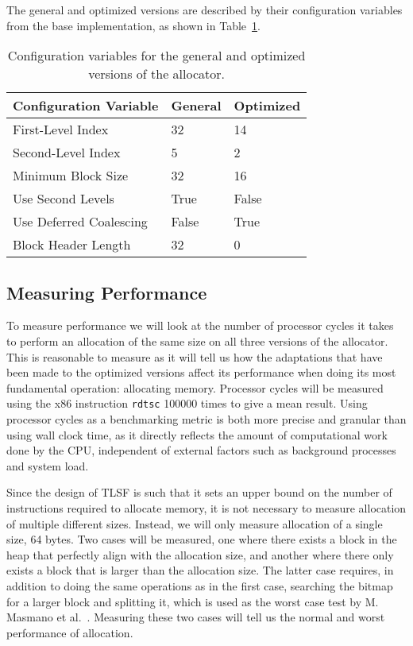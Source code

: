 The general and optimized versions are described by their configuration variables from the base implementation, as shown in Table~\ref{table:configuration-variables}.

\begin{table}[H]
\centering
\begin{tabular}{lllll}
\hline
Configuration Variable  & General  & \multicolumn{3}{l}{Optimized} \\ \hline
First-Level Index       & 32       & \multicolumn{3}{l}{14}        \\
Second-Level Index      & 5        & \multicolumn{3}{l}{2}         \\
Minimum Block Size      & 32       & \multicolumn{3}{l}{16 }       \\
Use Second Levels       & True     & \multicolumn{3}{l}{False}     \\
Use Deferred Coalescing & False    & \multicolumn{3}{l}{True}      \\
Block Header Length     & 32       & \multicolumn{3}{l}{0}        
\end{tabular}
\caption{Configuration variables for the general and optimized versions of the allocator.}
\label{table:configuration-variables}
\end{table}

\subsection{Measuring Performance}

To measure performance we will look at the number of processor cycles it takes to perform an allocation of the same size on all three versions of the allocator. This is reasonable to measure as it will tell us how the adaptations that have been made to the optimized versions affect its performance when doing its most fundamental operation: allocating memory. Processor cycles will be measured using the x86 instruction \texttt{rdtsc} 100000 times to give a mean result. Using processor cycles as a benchmarking metric is both more precise and granular than using wall clock time, as it directly reflects the amount of computational work done by the CPU, independent of external factors such as background processes and system load.

Since the design of TLSF is such that it sets an upper bound on the number of instructions required to allocate memory, it is not necessary to measure allocation of multiple different sizes. Instead, we will only measure allocation of a single size, 64 bytes. Two cases will be measured, one where there exists a block in the heap that perfectly align with the allocation size, and another where there only exists a block that is larger than the allocation size. The latter case requires, in addition to doing the same operations as in the first case, searching the bitmap for a larger block and splitting it, which is used as the worst case test by M. Masmano et al.~\cite{TLSF}. Measuring these two cases will tell us the normal and worst performance of allocation.

